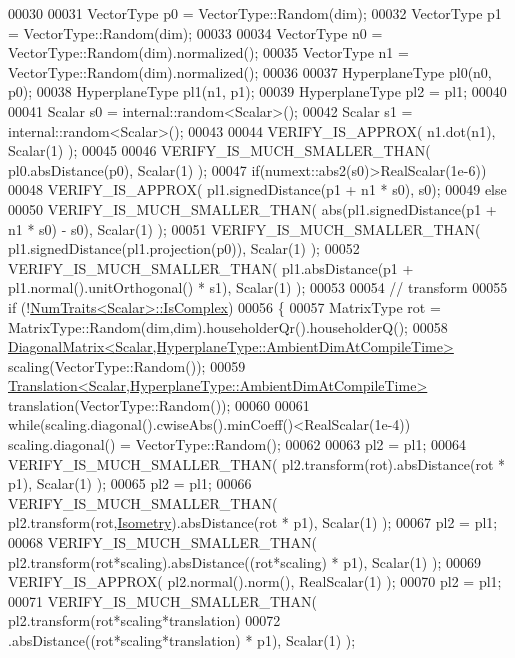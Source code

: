 \begin{DoxyCode}
00030 
00031   VectorType p0 = VectorType::Random(dim);
00032   VectorType p1 = VectorType::Random(dim);
00033 
00034   VectorType n0 = VectorType::Random(dim).normalized();
00035   VectorType n1 = VectorType::Random(dim).normalized();
00036 
00037   HyperplaneType pl0(n0, p0);
00038   HyperplaneType pl1(n1, p1);
00039   HyperplaneType pl2 = pl1;
00040 
00041   Scalar s0 = internal::random<Scalar>();
00042   Scalar s1 = internal::random<Scalar>();
00043 
00044   VERIFY\_IS\_APPROX( n1.dot(n1), Scalar(1) );
00045 
00046   VERIFY\_IS\_MUCH\_SMALLER\_THAN( pl0.absDistance(p0), Scalar(1) );
00047   \textcolor{keywordflow}{if}(numext::abs2(s0)>RealScalar(1e-6))
00048     VERIFY\_IS\_APPROX( pl1.signedDistance(p1 + n1 * s0), s0);
00049   \textcolor{keywordflow}{else}
00050     VERIFY\_IS\_MUCH\_SMALLER\_THAN( abs(pl1.signedDistance(p1 + n1 * s0) - s0), Scalar(1) );
00051   VERIFY\_IS\_MUCH\_SMALLER\_THAN( pl1.signedDistance(pl1.projection(p0)), Scalar(1) );
00052   VERIFY\_IS\_MUCH\_SMALLER\_THAN( pl1.absDistance(p1 +  pl1.normal().unitOrthogonal() * s1), Scalar(1) );
00053 
00054   \textcolor{comment}{// transform}
00055   \textcolor{keywordflow}{if} (!\hyperlink{group___core___module_struct_eigen_1_1_num_traits}{NumTraits<Scalar>::IsComplex})
00056   \{
00057     MatrixType rot = MatrixType::Random(dim,dim).householderQr().householderQ();
00058     \hyperlink{group___core___module_class_eigen_1_1_diagonal_matrix}{DiagonalMatrix<Scalar,HyperplaneType::AmbientDimAtCompileTime>}
       scaling(VectorType::Random());
00059     \hyperlink{group___geometry___module_class_eigen_1_1_translation}{Translation<Scalar,HyperplaneType::AmbientDimAtCompileTime>}
       translation(VectorType::Random());
00060     
00061     \textcolor{keywordflow}{while}(scaling.diagonal().cwiseAbs().minCoeff()<RealScalar(1e-4)) scaling.diagonal() = 
      VectorType::Random();
00062 
00063     pl2 = pl1;
00064     VERIFY\_IS\_MUCH\_SMALLER\_THAN( pl2.transform(rot).absDistance(rot * p1), Scalar(1) );
00065     pl2 = pl1;
00066     VERIFY\_IS\_MUCH\_SMALLER\_THAN( pl2.transform(rot,\hyperlink{group__enums_ggaee59a86102f150923b0cac6d4ff05107a080cd5366173608f701cd945c2335568}{Isometry}).absDistance(rot * p1), Scalar(1) );
00067     pl2 = pl1;
00068     VERIFY\_IS\_MUCH\_SMALLER\_THAN( pl2.transform(rot*scaling).absDistance((rot*scaling) * p1), Scalar(1) );
00069     VERIFY\_IS\_APPROX( pl2.normal().norm(), RealScalar(1) );
00070     pl2 = pl1;
00071     VERIFY\_IS\_MUCH\_SMALLER\_THAN( pl2.transform(rot*scaling*translation)
00072                                   .absDistance((rot*scaling*translation) * p1), Scalar(1) );

\end{DoxyCode}
